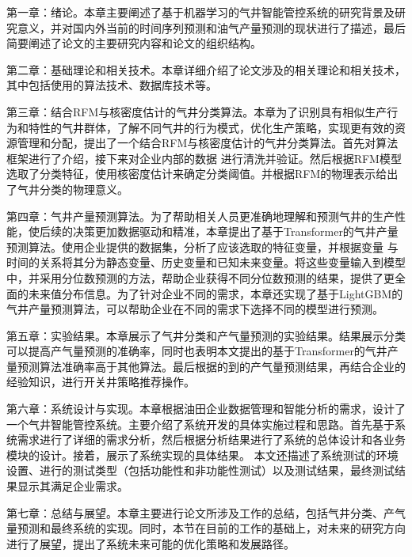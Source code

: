 第一章：绪论。本章主要阐述了基于机器学习的气井智能管控系统的研究背景及研究意义，并对国内外当前的时间序列预测和油气产量预测的现状进行了描述，最后简要阐述了论文的主要研究内容和论文的组织结构。

第二章：基础理论和相关技术。本章详细介绍了论文涉及的相关理论和相关技术，其中包括使用的算法技术、数据库技术等。

第三章：结合RFM与核密度估计的气井分类算法。本章为了识别具有相似生产行为和特性的气井群体，了解不同气井的行为模式，优化生产策略，实现更有效的资源管理和分配，提出了一个结合RFM与核密度估计的气井分类算法。首先对算法框架进行了介绍，接下来对企业内部的数据
进行清洗并验证。然后根据RFM模型选取了分类特征，使用核密度估计来确定分类阈值。并根据RFM的物理表示给出了气井分类的物理意义。

第四章：气井产量预测算法。为了帮助相关人员更准确地理解和预测气井的生产性能，使后续的决策更加数据驱动和精准，本章提出了基于Transformer的气井产量预测算法。使用企业提供的数据集，分析了应该选取的特征变量，并根据变量
与时间的关系将其分为静态变量、历史变量和已知未来变量。将这些变量输入到模型中，并采用分位数预测的方法，帮助企业获得不同分位数预测的结果，提供了更全面的未来值分布信息。为了针对企业不同的需求，本章还实现了基于LightGBM的气井产量预测算法，可以帮助企业在不同的需求下选择不同的模型进行预测。

第五章：实验结果。本章展示了气井分类和产气量预测的实验结果。结果展示分类可以提高产气量预测的准确率，同时也表明本文提出的基于Transformer的气井产量预测算法准确率高于其他算法。最后根据的到的产气量预测结果，再结合企业的经验知识，进行开关井策略推荐操作。

第六章：系统设计与实现。本章根据油田企业数据管理和智能分析的需求，设计了一个气井智能管控系统。主要介绍了系统开发的具体实施过程和思路。首先基于系统需求进行了详细的需求分析，然后根据分析结果进行了系统的总体设计和各业务模块的设计。接着，展示了系统实现的具体结果。
本文还描述了系统测试的环境设置、进行的测试类型（包括功能性和非功能性测试）以及测试结果，最终测试结果显示其满足企业需求。

第七章：总结与展望。本章主要进行论文所涉及工作的总结，包括气井分类、产气量预测和最终系统的实现。同时，本节在目前的工作的基础上，对未来的研究方向进行了展望，提出了系统未来可能的优化策略和发展路径。